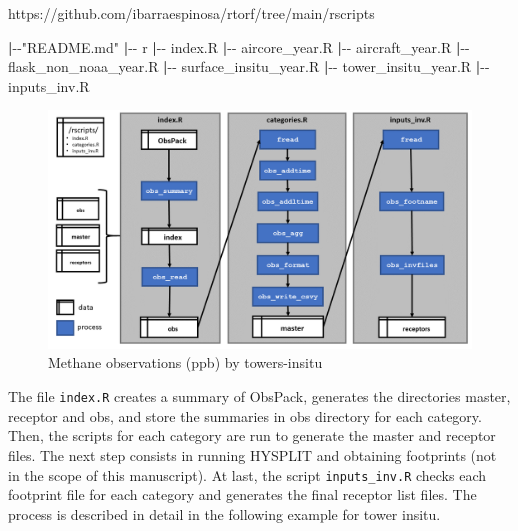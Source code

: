 \documentclass[preprint, 3p,
authoryear]{elsarticle} %
\newenvironment{Shaded}{\begin{snugshade}}{\end{snugshade}}
\newcommand{\ExtensionTok}[1]{#1}
\newcommand{\KeywordTok}[1]{\textcolor[rgb]{0.13,0.29,0.53}{\textbf{#1}}}
\newcommand{\NormalTok}[1]{#1}
\newcommand{\StringTok}[1]{\textcolor[rgb]{0.31,0.60,0.02}{#1}}
\begin{document}
https://github.com/ibarraespinosa/rtorf/tree/main/rscripts

\begin{Shaded}
\begin{Highlighting}[]
\KeywordTok{|}\ExtensionTok{{-}{-}}\StringTok{"README.md"}
\KeywordTok{|}\ExtensionTok{{-}{-}}\NormalTok{ r}
    \KeywordTok{|}\ExtensionTok{{-}{-}}\NormalTok{ index.R}
    \KeywordTok{|}\ExtensionTok{{-}{-}}\NormalTok{ aircore\_year.R }
    \KeywordTok{|}\ExtensionTok{{-}{-}}\NormalTok{ aircraft\_year.R}
    \KeywordTok{|}\ExtensionTok{{-}{-}}\NormalTok{ flask\_non\_noaa\_year.R}
    \KeywordTok{|}\ExtensionTok{{-}{-}}\NormalTok{ surface\_insitu\_year.R}
    \KeywordTok{|}\ExtensionTok{{-}{-}}\NormalTok{ tower\_insitu\_year.R}
    \KeywordTok{|}\ExtensionTok{{-}{-}}\NormalTok{ inputs\_inv.R}
\end{Highlighting}
\end{Shaded}

\begin{figure}
\includegraphics[width=1\linewidth,height=0.5\textheight]{flow/Slide1} \caption{Methane observations (ppb) by towers-insitu}\label{fig:flow}
\end{figure}

The file \texttt{index.R} creates a summary of ObsPack, generates the
directories master, receptor and obs, and store the summaries in obs
directory for each category. Then, the scripts for each category are run
to generate the master and receptor files. The next step consists in
running HYSPLIT and obtaining footprints (not in the scope of this
manuscript). At last, the script \texttt{inputs\_inv.R} checks each
footprint file for each category and generates the final receptor list
files. The process is described in detail in the following example for
tower insitu.
\end{document}
